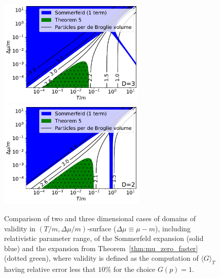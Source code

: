 \documentclass[sn-mathphys,Numbered]{sn-jnl}
\newcommand{\rTh}[1]{Theorem~{\ref{#1}}}
\begin{document}
\begin{figure} %
\centering
\includegraphics[width=0.625\textwidth]{./plot/Sommerfeld_vs_ours_regions_D3_1_term_deBroglie.pdf}\\
\includegraphics[width=0.625\textwidth]{./plot/Sommerfeld_vs_ours_regions_D2_1_term_deBroglie.pdf}
\caption{Comparison of two and three dimensional cases of domains of validity in $(T/m,\Delta\mu/m)$-surface ($\Delta\mu\equiv\mu-m$), including relativistic parameter range, of the Sommerfeld expansion (solid blue) and the expansion from \rTh{thm:mu_zero_faster} (dotted green), where validity is defined as the computation of $\langle G\rangle_T$ having relative error less that $10\%$ for the choice $G(p)=1$. }\label{fig:Thm3_vs_Sommerfeld_regions_terms_comp_deBroglie}
\end{figure}





\end{document}
